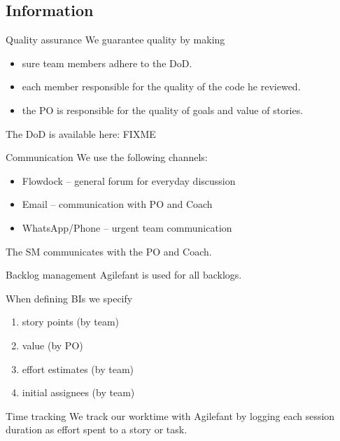\documentclass{beamer}
\begin{document}
\subsection{Information}
\begin{frame}{Quality assurance}
  We guarantee quality by making

  \begin{itemize}
  \item sure team members adhere to the DoD.
  \item each member responsible for the quality of the code he reviewed.
  \item the PO is responsible for the quality of goals and value of stories.
  \end{itemize}

  The DoD is available here: FIXME
\end{frame}
\begin{frame}{Communication}
  We use the following channels:

  \begin{itemize}
  \item Flowdock – general forum for everyday discussion
  \item Email – communication with PO and Coach
  \item WhatsApp/Phone – urgent team communication
  \end{itemize}

  The SM communicates with the PO and Coach.
\end{frame}
\begin{frame}{Backlog management}
  Agilefant is used for all backlogs.
  
  When defining BIs we specify

  \begin{enumerate}
  \item story points (by team)
  \item value (by PO)
  \item effort estimates (by team)
  \item initial assignees (by team)
  \end{enumerate}
\end{frame}
\begin{frame}{Time tracking}
  We track our worktime with Agilefant by logging each session
  duration as effort spent to a story or task.
\end{frame}
\end{document}
